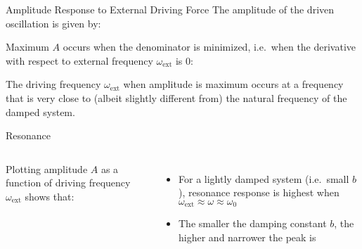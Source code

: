 \documentclass[12pt,compress,aspectratio=169]{beamer}
\begin{document}
\begin{frame}{Amplitude Response to External Driving Force}
  The amplitude of the driven oscillation is given by:
  
  
  Maximum $A$ occurs when the denominator is minimized, i.e.\ when the
  derivative with respect to external frequency $\omega_\text{ext}$ is 0:


  The driving frequency $\omega_\text{ext}$ when amplitude is maximum occurs at a
  frequency that is very close to (albeit slightly different from) the natural
  frequency of the damped system.
\end{frame}



\begin{frame}{Resonance}
  \begin{columns}

    Plotting amplitude $A$ as a function of driving frequency
    $\omega_\text{ext}$ shows that:
    \begin{itemize}
    \item For a lightly damped system (i.e.\ small $b$), resonance response is
      highest when $\omega_\text{ext}\approx\omega\approx\omega_0$
    \item The smaller the damping constant $b$, the higher and narrower the
      peak is
    \end{itemize}
  \end{columns}
\end{frame}
\end{document}
